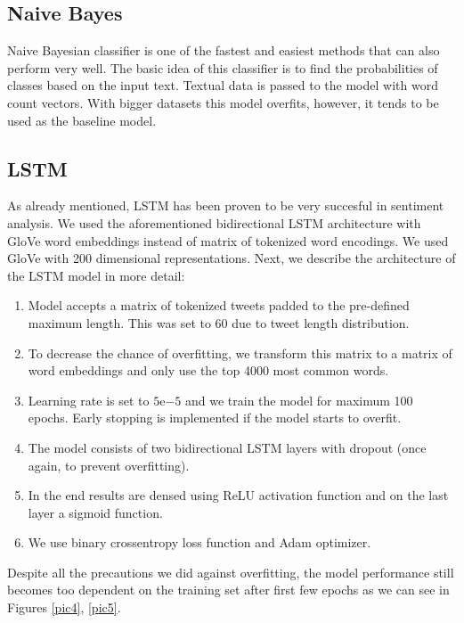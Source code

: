 \documentclass[conference]{IEEEtran}
\begin{document}
\subsection{Naive Bayes}
Naive Bayesian classifier is one of the fastest and easiest methods that can also perform very well. The basic idea of this classifier is to find the probabilities of classes based on the input text. Textual data is passed to the model with word count vectors. With bigger datasets this model overfits, however, it tends to be used as the baseline model.

\subsection{LSTM}
As already mentioned, LSTM has been proven to be very succesful in sentiment analysis. We used the aforementioned bidirectional LSTM architecture with GloVe word embeddings instead of matrix of tokenized word encodings. We used GloVe with 200 dimensional representations. Next, we describe the architecture of the LSTM model in more detail:
\begin{enumerate}
	\item Model accepts a matrix of tokenized tweets padded to the pre-defined maximum length. This was set to 60 due to tweet length distribution.
	\item To decrease the chance of overfitting, we transform this matrix to a matrix of word embeddings and only use the top 4000 most common words.
	\item Learning rate is set to $5\mathrm{e}{-5}$ and we train the model for maximum 100 epochs. Early stopping is implemented if the model starts to overfit.
	\item The model consists of two bidirectional LSTM layers with dropout (once again, to prevent overfitting).
	\item In the end results are densed using ReLU activation function and on the last layer a sigmoid function.
	\item We use binary crossentropy loss function and Adam optimizer.
\end{enumerate}

Despite all the precautions we did against overfitting, the model performance still becomes too dependent on the training set after first few epochs as we can see in Figures \ref{pic4}, \ref{pic5}. 
\end{document}
